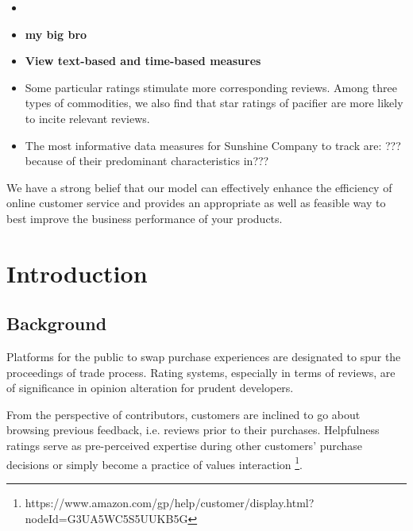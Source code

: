 \documentclass[12pt]{article}%
\begin{document}
\begin{itemize}
	\item[1.]\textbf{}
	\item[2.]\textbf{my big bro}
	\item[3.]\textbf{View text-based and time-based measures }
	\item Some particular ratings stimulate more corresponding reviews. Among three types of commodities, we also find that star ratings of pacifier are more likely to incite relevant reviews.
	\item The most informative data measures for Sunshine Company to track are: ??? because of their predominant characteristics in???
\end{itemize}

We have a strong belief that our model can effectively enhance the efficiency of online customer service and provides an appropriate as well as feasible way to best improve the business performance of your products.


\thispagestyle{empty}

\newpage
\thispagestyle{empty}
\tableofcontents   
\setcounter{page}{0}                                               
\newpage      

\fontsize{13}{12.5}\selectfont
\setmainfont{TeX Gyre Pagella}    
\pagestyle{fancy} 
\chead{}  \lfoot{}	%
\cfoot{\thepage}
\rfoot{}

\section{Introduction}	
\subsection{Background}
Platforms for the public to swap purchase experiences are designated to spur the proceedings of trade process. Rating systems, especially in terms of reviews, are of significance in opinion alteration for prudent developers.
	
From the perspective of contributors, customers are inclined to go about browsing previous feedback, i.e. reviews prior to their purchases. Helpfulness ratings serve as pre-perceived expertise during other customers’ purchase decisions or simply become a practice of values interaction \footnote{\quad https://www.amazon.com/gp/help/customer/display.html?nodeId=G3UA5WC5S5UUKB5G}.
\end{document}

